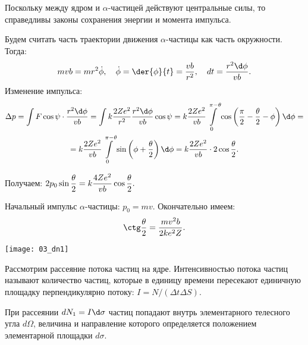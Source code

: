 Поскольку между ядром и \( \alpha \)-частицей действуют центральные силы, то
справедливы законы сохранения энергии и момента импульса.
 
Будем считать часть траектории движения \( \alpha \)-частицы как часть
окружности. Тогда:
\[
    m vb = m r^2\dot{\phi}, \quad \dot{\phi} = \der{\phi}{t} =
    \frac{vb}{r^2}, \quad dt = \frac{r^2\d\phi}{vb}.
\]
Изменение импульса:
\begin{gather*}
    \Delta p = \int F\cos\psi\cdot\frac{r^2\d\phi}{vb} = \int k\frac{2Ze^2}{r^2}
    \frac{r^2\d\phi}{vb}\cos\psi = k\frac{2Ze^2}{vb}\int\limits_0^{\pi - \theta}
    \cos\left( \frac{\pi}{2} - \frac{\theta}{2} - \phi \right)\d\phi = \\
    = k\frac{2Ze^2}{vb}\int\limits_0^{\pi - \theta} \sin\left( \phi +
    \frac{\theta}{2}\right)\d\phi = k\frac{2Ze^2}{vb}\cdot2\cos\frac{\theta}{2}.
\end{gather*}

Получаем: \( \displaystyle 2p_0\sin\frac{\theta}{2} = k\frac{4Ze^2}{vb}\cos\frac{\theta}
{2}. \)

Начальный импульс \( \alpha \)-частицы: \( p_0 = mv \). Окончательно имеем:
\begin{equation}
    \ctg\frac{\theta}{2} = \frac{mv^2b}{2ke^2Z}.
    \label{eq:3_1}
\end{equation}


\begin{minipage}{.35\textwidth}
    \texttt{[image: 03\_dn1]}
\end{minipage}
\begin{minipage}{.6\textwidth}
Рассмотрим рассеяние потока частиц на ядре. Интенсивностью потока частиц
называют количество частиц, которые в единицу времени пересекают единичную
площадку перпендикулярно потоку: \( I = N/(\Delta t\Delta S) \).
 
При рассеянии \( dN_1 = I\d\sigma \) частиц попадают внутрь элементарного
телесного угла \( d\Omega \), величина и направление которого определяется
положением элементарной площадки \( d\sigma \).
\end{minipage}

